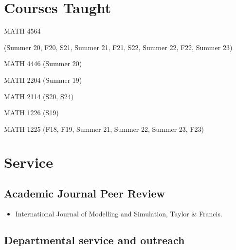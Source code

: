 \documentclass[11pt,letterpaper]{report}
\begin{document}
   


\section*{Courses Taught}
    \begin{tablist}
        \item[MATH 4564] 
        
        \hfill (Summer 20, F20, S21, Summer 21, F21, S22,
        Summer 22, F22, Summer 23)

        \item[MATH 4446] 
        \hfill (Summer 20)
        \item[MATH 2204]
        \hfill (Summer 19)

        \item[MATH 2114]
        \hfill (S20, S24)
        \item[MATH 1226]
        \hfill (S19) 

        \item[MATH 1225] \hfill 
        (F18, F19, Summer 21, Summer 22, Summer 23, F23)
    \end{tablist}
        
    


    \section*{Service}

  

    \subsection*{Academic Journal Peer Review}

    \begin{itemize}
      \item International Journal of Modelling and Simulation, Taylor \& Francis.
    \end{itemize}

    \subsection*{Departmental service and outreach}
\end{document}
